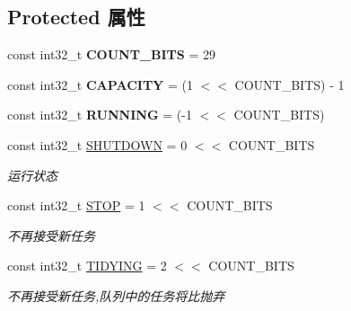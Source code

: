 \subsection*{Protected 属性}
\begin{DoxyCompactItemize}
\item 
\mbox{\label{classThreadPoolExecutor_af82bff422304406f59a14b5b638c2b42}} 
const int32\+\_\+t {\bfseries C\+O\+U\+N\+T\+\_\+\+B\+I\+TS} = 29
\item 
\mbox{\label{classThreadPoolExecutor_aac96b726327ad0d07709085ab49c4f58}} 
const int32\+\_\+t {\bfseries C\+A\+P\+A\+C\+I\+TY} = (1 $<$$<$ C\+O\+U\+N\+T\+\_\+\+B\+I\+TS) -\/ 1
\item 
\mbox{\label{classThreadPoolExecutor_a9e28d5aa0cb4500921f7244565b8bed8}} 
const int32\+\_\+t {\bfseries R\+U\+N\+N\+I\+NG} = (-\/1 $<$$<$ C\+O\+U\+N\+T\+\_\+\+B\+I\+TS)
\item 
\mbox{\label{classThreadPoolExecutor_aa0958f2bf040bf2f199c629ec9145b44}} 
const int32\+\_\+t \hyperlink{classThreadPoolExecutor_aa0958f2bf040bf2f199c629ec9145b44}{S\+H\+U\+T\+D\+O\+WN} = 0 $<$$<$ C\+O\+U\+N\+T\+\_\+\+B\+I\+TS
\begin{DoxyCompactList}\small\item\em 运行状态 \end{DoxyCompactList}\item 
\mbox{\label{classThreadPoolExecutor_ae3c0ff657b3c0d8bbaf7f10bfdf587ca}} 
const int32\+\_\+t \hyperlink{classThreadPoolExecutor_ae3c0ff657b3c0d8bbaf7f10bfdf587ca}{S\+T\+OP} = 1 $<$$<$ C\+O\+U\+N\+T\+\_\+\+B\+I\+TS
\begin{DoxyCompactList}\small\item\em 不再接受新任务 \end{DoxyCompactList}\item 
\mbox{\label{classThreadPoolExecutor_a3d2a0964f6bce420433491da80000c4c}} 
const int32\+\_\+t \hyperlink{classThreadPoolExecutor_a3d2a0964f6bce420433491da80000c4c}{T\+I\+D\+Y\+I\+NG} = 2 $<$$<$ C\+O\+U\+N\+T\+\_\+\+B\+I\+TS
\begin{DoxyCompactList}\small\item\em 不再接受新任务,队列中的任务将比抛弃 \end{DoxyCompactList}\item 
$$
\end{DoxyCompactItemize}
